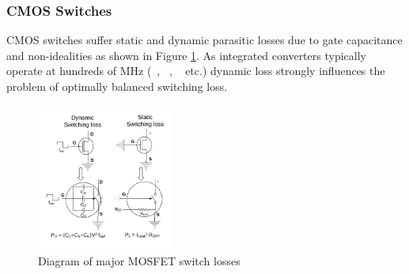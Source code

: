 \documentclass[letterpaper,twocolumn,10pt]{article}
\begin{document}
\subsubsection{CMOS Switches }
CMOS switches suffer static and dynamic parasitic losses due to gate capacitance and non-idealities as shown in Figure \ref{SWLosses}. As integrated converters typically operate at hundreds of MHz (~\cite{Alimadadi2008}, ~\cite{Bathily2012}, ~\cite{Sturcken2013} etc.) dynamic loss strongly influences the problem of optimally balanced switching loss.\\ %
\begin{figure}[here]
\includegraphics[width=0.4\textwidth]{SwitchLosses}
\caption{Diagram of major MOSFET switch losses}
\label{SWLosses}
\end{figure}
\end{document}
